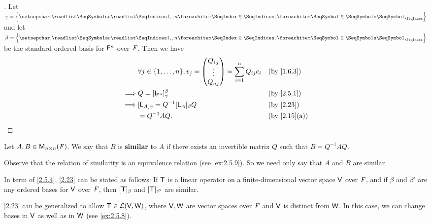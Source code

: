 \begin{proof}[]
	Let \(\gamma = \set{\seq{v}{1,,n}}\) and let \(\beta = \set{\seq{e}{1,,n}}\) be the standard ordered basis for \(\mathsf{F}^n\) over \(\mathit{F}\).
	Then we have
	\begin{align*}
		         & \forall j \in \set{1, \dots, n}, v_j = \begin{pmatrix}
			                                                  Q_{1 j} \\
			                                                  \vdots  \\
			                                                  Q_{n j}
		                                                  \end{pmatrix} = \sum_{i = 1}^n Q_{i j} e_i &  & \by{1.6.3} \\
		\implies & Q = [\IT_{\vs{F}^n}]_{\gamma}^{\beta}                  &  & \by{2.5.1}                            \\
		\implies & [\L_A]_{\gamma} = Q^{-1} [\L_A]_{\beta} Q              &  & \by{2.23}                             \\
		         & = Q^{-1} A Q.                                          &  & \by{2.15}[a]
	\end{align*}
\end{proof}

\begin{defn}\label{2.5.4}
	Let \(A, B \in \mathsf{M}_{{n} \times n}({\mathit{F}})\).
	We say that \(B\) is \textbf{similar} to \(A\) if there exists an invertible matrix \(Q\) such that \(B = Q^{-1} A Q\).
\end{defn}

\begin{note}
	Observe that the relation of similarity is an equivalence relation
	(see \cref{ex:2.5.9}).
	So we need only say that \(A\) and \(B\) are similar.
\end{note}

\begin{note}
	In term of \cref{2.5.4}, \cref{2.23} can be stated as follows:
	If \(\mathsf{T}\) is a linear operator on a finite-dimensional vector space \(\mathsf{V}\) over \(\mathit{F}\), and if \(\beta\) and \(\beta'\) are any ordered bases for \(\mathsf{V}\) over \(\mathit{F}\), then \([\mathsf{T}]_{\beta}\) and \([\mathsf{T}]_{\beta'}\) are similar.
\end{note}

\begin{note}
	\cref{2.23} can be generalized to allow \(\mathsf{T} \in \mathcal{L}(\mathsf{V}, \mathsf{W})\), where \(\mathsf{V}, \mathsf{W}\) are vector spaces over \(\mathit{F}\) and \(\mathsf{V}\) is distinct from \(\mathsf{W}\).
	In this case, we can change bases in \(\mathsf{V}\) as well as in \(\mathsf{W}\)
	(see \cref{ex:2.5.8}).
\end{note}

